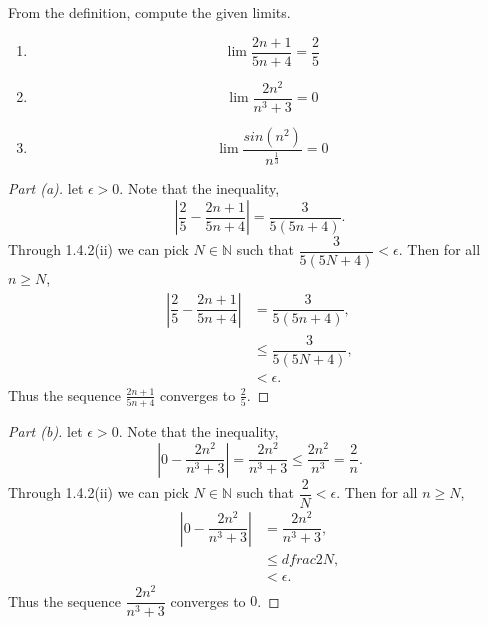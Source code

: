 \documentclass[12pt]{article}
\makeatletter
\theoremstyle{homework}
\newenvironment{exercise}[1]
{\def\@currentlabel{#1}\exercisecore}
{\endexercisecore}
\newcommand{\Nats}{\ensuremath{\mathbb N}}
\makeatother
\begin{document}
\begin{exercise}{2.2.2}
From the definition, compute the given limits.
\begin{enumerate}
	\item[\textbf{a.}] 
	\begin{equation*}
		\lim \dfrac{2n+1}{5n+4} = \dfrac{2}{5}
	\end{equation*} 
	\item[\textbf{b.}]
	\begin{equation*}
		\lim \dfrac{2n^2}{n^3+3} = 0 
	\end{equation*}
	\item[\textbf{c.}] 
	\begin{equation*}
		\lim \dfrac{sin(n^2)}{n^\frac{1}{3}} = 0 
	\end{equation*} 
\end{enumerate}
\end{exercise}
\begin{proof}[Part (a)] let $\epsilon > 0$. Note that the inequality,
	\begin{equation*}
		|\dfrac{2}{5} - \dfrac{2n+1}{5n+4}| = \dfrac{3}{5(5n+4)}.
	\end{equation*}
	Through 1.4.2(ii) we can pick $N \in \Nats$ such that $\dfrac{3}{5(5N+4)}<\epsilon$. Then for all $n \geq N$,
	\begin{align*}
		|\dfrac{2}{5} - \dfrac{2n+1}{5n+4}| &= \dfrac{3}{5(5n+4)},\\
		&\le \dfrac{3}{5(5N+4)},\\
		&< \epsilon.
	\end{align*}
	Thus the sequence $\frac{2n+1}{5n+4}$ converges to $\frac{2}{5}$.  
\end{proof}
\begin{proof}[Part (b)] let $\epsilon > 0$. Note that the inequality,
	\begin{equation*}
		|0 - \dfrac{2n^2}{n^3+3}| = \dfrac{2n^2}{n^3+3} \le \dfrac{2n^2}{n^3} = \dfrac{2}{n}.
	\end{equation*}
	Through 1.4.2(ii) we can pick $N \in \Nats$ such that $\dfrac{2}{N}<\epsilon$. Then for all $n \geq N$,
	\begin{align*}
		|0 - \dfrac{2n^2}{n^3+3}| &= \dfrac{2n^2}{n^3+3},\\
		&\le dfrac{2}{N},\\
		&< \epsilon.
	\end{align*}
	Thus the sequence $\dfrac{2n^2}{n^3+3}$ converges to $0$.  
\end{proof} 
\end{document}
